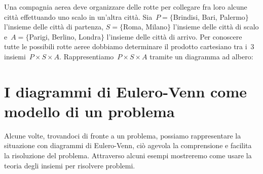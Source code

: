 \begin{exrig}
 \begin{esempio}
 Una compagnia aerea deve organizzare delle rotte per collegare fra loro alcune città effettuando uno scalo
in un'altra città. Sia~$P=\{$Brindisi, Bari, Palermo$\}$ l'insieme delle città di
partenza, $S=\{$Roma, Milano$\}$ l'insieme delle città di
scalo e~$A=\{$Parigi, Berlino, Londra$\}$ l'insieme delle città di
arrivo. Per conoscere tutte le possibili rotte aeree dobbiamo
determinare il prodotto cartesiano tra i~3 insiemi~$P\times S\times A$.
Rappresentiamo~$P\times S\times A$ tramite un diagramma ad albero:
\begin{center}

\end{center}
 \end{esempio}
\end{exrig}

\section{I diagrammi di Eulero-Venn come modello di un problema}
Alcune volte, trovandoci di fronte a un problema, possiamo rappresentare
la situazione con diagrammi di Eulero-Venn, ciò agevola la
comprensione e facilita la risoluzione del problema. Attraverso alcuni
esempi mostreremo come usare la teoria degli insiemi per risolvere
problemi.

